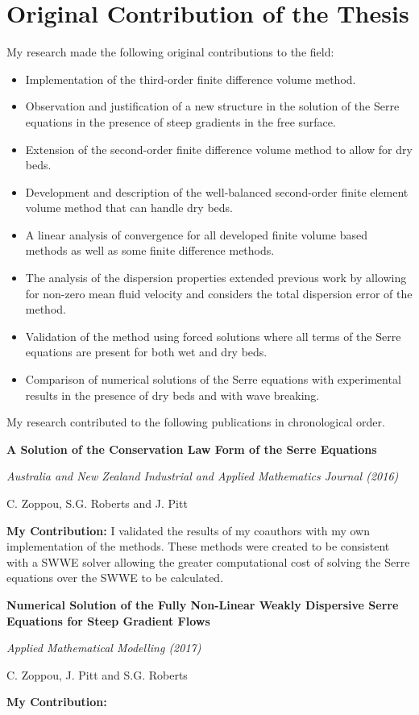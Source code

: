 \section{Original Contribution of the Thesis}
My research made the following original contributions to the field:
\begin{itemize}
	\item Implementation of the third-order finite difference volume method.
	\item Observation and justification of a new structure in the solution of the Serre equations in the presence of steep gradients in the free surface.
	\item Extension of the second-order finite difference volume method to allow for dry beds.
	\item Development and description of the well-balanced second-order finite element volume method that can handle dry beds.
	\item A linear analysis of convergence for all developed finite volume based methods as well as some finite difference methods.
	\item The analysis of the dispersion properties extended previous work by allowing for non-zero mean fluid velocity and considers the total dispersion error of the method.
	\item Validation of the method using forced solutions where all terms of the Serre equations are present for both wet and dry beds.
	\item Comparison of numerical solutions of the Serre equations with experimental results in the presence of dry beds and with wave breaking. 
\end{itemize}
My research contributed to the following publications in chronological order.
\begin{center}
	\textbf{
		\Large A Solution of the Conservation Law Form of the Serre Equations}
	
	\vspace*{\baselineskip}
	
	\textit{Australia and New Zealand Industrial and Applied Mathematics Journal (2016)}
	
	{C. Zoppou, S.G. Roberts and J. Pitt}
	\vspace*{0.5\baselineskip}
\end{center}
\textbf{My Contribution:}
I validated the results of my coauthors with my own implementation of the methods. These methods were created to be consistent with a SWWE solver allowing the greater computational cost of solving the Serre equations over the SWWE to be calculated.  
\vspace*{\baselineskip}
\begin{center}
	\textbf{
		\Large Numerical Solution of the Fully Non-Linear Weakly Dispersive
		Serre Equations for Steep Gradient Flows}
	
	\vspace*{\baselineskip}
	
	\textit{Applied Mathematical Modelling (2017)}
	
	{C. Zoppou, J. Pitt and S.G. Roberts}
	\vspace*{0.5\baselineskip}
\end{center}
\textbf{My Contribution:}

